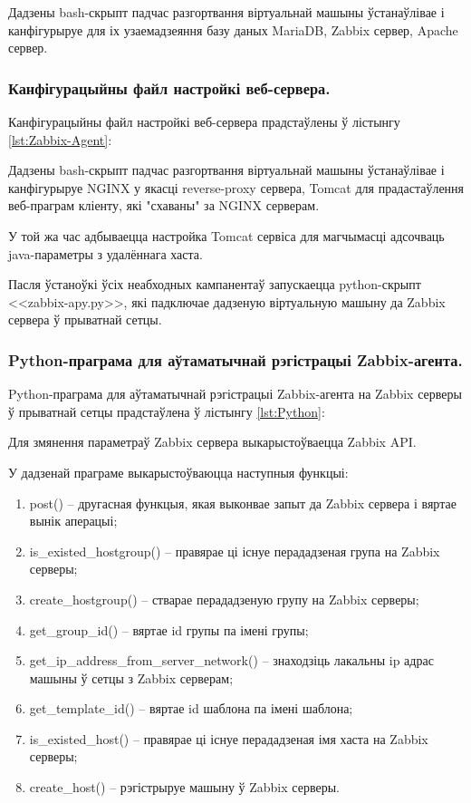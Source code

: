 Дадзены bash-скрыпт падчас разгортвання віртуальнай машыны
ўстанаўлівае і канфігурыруе для іх узаемадзеяння
базу даных MariaDB, Zabbix сервер, Apache сервер.

\subsubsection{Канфігурацыйны файл настройкі веб-сервера.}
Канфігурацыйны файл настройкі веб-сервера прадстаўлены ў лістынгу
\ref{lst:Zabbix-Agent}:



Дадзены bash-скрыпт падчас разгортвання віртуальнай машыны
ўстанаўлівае і канфігурыруе NGINX у якасці reverse-proxy сервера,
Tomcat для прадастаўлення веб-праграм кліенту, які "схаваны" за NGINX серверам.

У той жа час адбываецца настройка Tomcat сервіса для магчымасці адсочваць
java-параметры з удалённага хаста.

Пасля ўстаноўкі ўсіх неабходных кампанентаў запускаецца python-скрыпт
<<zabbix-apy.py>>, які падключае дадзеную віртуальную машыну да
Zabbix сервера ў прыватнай сетцы.

\subsubsection{Python-праграма для аўтаматычнай рэгістрацыі Zabbix-агента.}
Python-праграма для аўтаматычнай рэгістрацыі Zabbix-агента на Zabbix серверы ў
прыватнай сетцы прадстаўлена ў лістынгу
\ref{lst:Python}:



Для змянення параметраў Zabbix сервера выкарыстоўваецца Zabbix API.

У дадзенай праграме выкарыстоўваюцца наступныя функцыі:
\begin{enumerate}
    \item post() -- другасная функцыя, якая выконвае запыт да Zabbix сервера і вяртае вынік аперацыі;
    \item is\_existed\_hostgroup() -- правярае ці існуе перададзеная група на Zabbix серверы;
    \item create\_hostgroup() -- стварае перададзеную групу на Zabbix серверы;
    \item get\_group\_id() --  вяртае id групы па імені групы;
    \item get\_ip\_address\_from\_server\_network() -- знаходзіць лакальны ip адрас машыны ў сетцы з Zabbix серверам;
    \item get\_template\_id() --  вяртае id шаблона па імені шаблона;
    \item is\_existed\_host() -- правярае ці існуе перададзеная імя хаста на Zabbix серверы;
    \item create\_host() -- рэгістрыруе машыну ў Zabbix серверы.
\end{enumerate}
